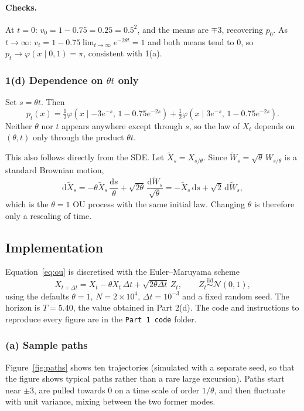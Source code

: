 \documentclass[11pt]{article}
\newcommand{\N}{\mathcal{N}}
\newcommand{\dd}{\mathrm{d}}
\begin{document}
\paragraph{Checks.} At $t=0$: $v_0 = 1-0.75 = 0.25 = 0.5^2$, and the means are $\mp3$, recovering $p_0$.
As $t\to\infty$: $v_t = 1-0.75\lim_{t\to\infty}e^{-2\theta t} = 1$ and both means tend to $0$, so
$p_t\to\varphi(x\mid0,1)=\pi$, consistent with 1(a).

\subsubsection*{1(d) Dependence on $\theta t$ only}

Set $s=\theta t$. Then
\[
p_t(x) = \tfrac12\varphi\!\left(x\mid -3e^{-s},\,1-0.75e^{-2s}\right) + \tfrac12\varphi\!\left(x\mid 3e^{-s},\,1-0.75e^{-2s}\right).
\]
Neither $\theta$ nor $t$ appears anywhere except through $s$, so the law of $X_t$ depends on $(\theta,t)$
only through the product $\theta t$.

This also follows directly from the SDE. Let $\tilde X_s = X_{s/\theta}$. Since
$\tilde W_s = \sqrt{\theta}\,W_{s/\theta}$ is a standard Brownian motion,
\[
\dd\tilde X_s = -\theta\tilde X_s\,\frac{\dd s}{\theta} + \sqrt{2\theta}\,\frac{\dd\tilde W_s}{\sqrt\theta}
= -\tilde X_s\,\dd s + \sqrt2\,\dd\tilde W_s ,
\]
which is the $\theta=1$ OU process with the same initial law. Changing $\theta$ is therefore only a
rescaling of time.

\subsection*{Implementation}

Equation~\eqref{eq:ou} is discretised with the Euler--Maruyama scheme
\[
X_{t+\Delta t} = X_t - \theta X_t\,\Delta t + \sqrt{2\theta\Delta t}\,Z_t,\qquad Z_t\overset{\text{iid}}{\sim}\N(0,1),
\]
using the defaults $\theta=1$, $N=2\times10^4$, $\Delta t=10^{-3}$ and a fixed random seed.
The horizon is $T=5.40$, the value obtained in Part 2(d). The code and instructions to reproduce every figure
are in the \texttt{Part 1 code} folder.

\subsubsection*{(a) Sample paths}

Figure~\ref{fig:paths} shows ten trajectories (simulated with a separate seed, so that the figure
shows typical paths rather than a rare large excursion). Paths start near $\pm3$, are pulled towards $0$ on a
time scale of order $1/\theta$, and then fluctuate with unit variance, mixing between the two
former modes.
\end{document}

